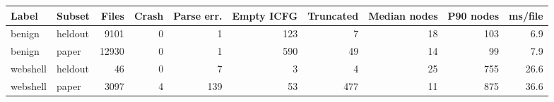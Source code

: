 \begin{tabular}{@{}llrrrrrrrr@{}}
\toprule
Label & Subset & Files & Crash & Parse err. & Empty ICFG & Truncated & Median nodes & P90 nodes & ms/file \\ \midrule
benign & heldout & 9101 & 0 & 1 & 123 & 7 & 18 & 103 & 6.9 \\
benign & paper & 12930 & 0 & 1 & 590 & 49 & 14 & 99 & 7.9 \\
webshell & heldout & 46 & 0 & 7 & 3 & 4 & 25 & 755 & 26.6 \\
webshell & paper & 3097 & 4 & 139 & 53 & 477 & 11 & 875 & 36.6 \\
\bottomrule
\end{tabular}

